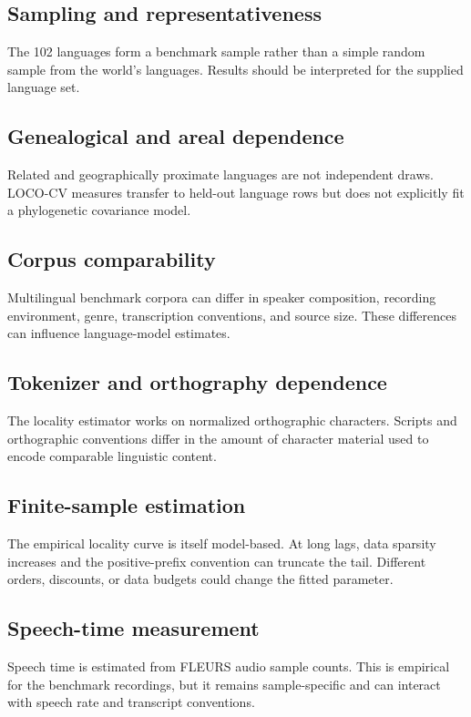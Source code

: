 \documentclass[11pt]{article}
\begin{document}
\subsection{Sampling and representativeness}
The 102 languages form a benchmark sample rather than a simple random sample from the world's languages. Results should be interpreted for the supplied language set.

\subsection{Genealogical and areal dependence}
Related and geographically proximate languages are not independent draws. LOCO-CV measures transfer to held-out language rows but does not explicitly fit a phylogenetic covariance model.

\subsection{Corpus comparability}
Multilingual benchmark corpora can differ in speaker composition, recording environment, genre, transcription conventions, and source size. These differences can influence language-model estimates.

\subsection{Tokenizer and orthography dependence}
The locality estimator works on normalized orthographic characters. Scripts and orthographic conventions differ in the amount of character material used to encode comparable linguistic content.

\subsection{Finite-sample estimation}
The empirical locality curve is itself model-based. At long lags, data sparsity increases and the positive-prefix convention can truncate the tail. Different orders, discounts, or data budgets could change the fitted parameter.

\subsection{Speech-time measurement}
Speech time is estimated from FLEURS audio sample counts. This is empirical for the benchmark recordings, but it remains sample-specific and can interact with speech rate and transcript conventions.
\end{document}
